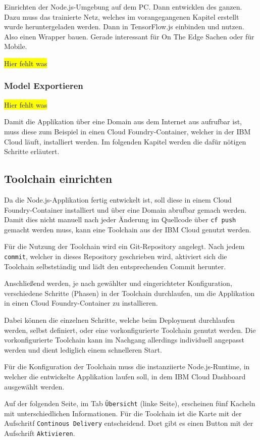 Einrichten der Node.js-Umgebung auf dem PC. Dann entwicklen des ganzen. Dazu muss das trainierte Netz, welches im
vorangegangenen Kapitel erstellt wurde heruntergeladen werden. Dann in TensorFlow.js einbinden und nutzen. Also einen
Wrapper bauen. Gerade interessant für On The Edge Sachen oder für Mobile.

\colorbox{yellow}{Hier fehlt was}

\subsubsection{Model Exportieren}
\colorbox{yellow}{Hier fehlt was}

Damit die Applikation über eine Domain aus dem Internet aus aufrufbar ist, muss diese zum Beispiel in einen Cloud
Foundry-Container, welcher in der IBM Cloud läuft, installiert werden. Im folgenden Kapitel werden die dafür nötigen
Schritte erläutert.

\subsection{Toolchain einrichten}
Da die Node.js-Applikation fertig entwickelt ist, soll diese in einem Cloud Foundry-Container installiert und über eine
Domain abrufbar gemach werden. Damit dies nicht manuell nach jeder Änderung im Quellcode über \texttt{cf push} gemacht
werden muss, kann eine Toolchain aus der IBM Cloud genutzt werden.

Für die Nutzung der Toolchain wird ein Git-Repository angelegt. Nach jedem \texttt{commit}, welcher in dieses Repository
geschrieben wird, aktiviert sich die Toolchain selbstständig und lädt den entsprechenden Commit herunter.

Anschließend werden, je nach gewählter und eingerichteter Konfiguration, verschiedene Schritte (Phasen) in der Toolchain
durchlaufen, um die Applikation in einen Cloud Foundry-Container zu installieren.

Dabei können die einzelnen Schritte, welche beim Deployment durchlaufen werden, selbst definiert, oder eine
vorkonfigurierte Toolchain genutzt werden. Die vorkonfigurierte Toolchain kann im Nachgang allerdings individuell
angepasst werden und dient lediglich einem schnelleren Start.

Für die Konfiguration der Toolchain muss die instanziierte Node.js-Runtime, in welcher die entwickelte Applikation laufen
soll, in dem IBM Cloud Dashboard ausgewählt werden.

Auf der folgenden Seite, im Tab \texttt{Übersicht} (linke Seite), erscheinen fünf Kacheln mit unterschiedlichen Informationen.
Für die Toolchain ist die Karte mit der Aufschritf \texttt{Continous Delivery} entscheidend. Dort gibt es einen Button
mit der Aufschrift \texttt{Aktivieren}.

